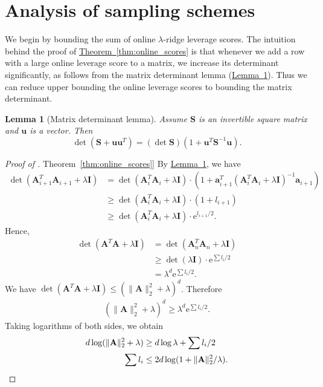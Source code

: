 \documentclass[11pt]{article}
\numberwithin{equation}{section}
\newtheorem{lemma}[theorem]{Lemma}
\theoremstyle{definition}
\theoremstyle{plain}
\newcommand{\eee}{\mathrm e}
\newcommand{\expref}[2]{\hyperref[#2]{#1~\ref{#2}}}
\newcommand{\bv}[1]{\mathbf{#1}}
\begin{document}
\section{Analysis of sampling schemes}
\label{sec:sampling}

We begin by bounding the sum of online $\lambda$-ridge leverage scores.
The intuition behind the proof of \expref{Theorem}{thm:online_scores} is that whenever we add a row with a large online leverage score to a matrix, we increase its determinant significantly, as follows from the matrix determinant lemma (\expref{Lemma}{lem:matdet}).
Thus we can reduce upper bounding the online leverage scores to bounding the matrix determinant.
\begin{lemma}[Matrix determinant lemma]
    \label{lem:matdet}
    Assume $\bv{S}$ is an invertible square matrix and $\bv{u}$ is a vector.
    Then
    $$
        \det(\bv{S} + \bv{u}\bv{u}^T) = (\det \bv{S})(1 + \bv{u}^T\bv{S}^{-1}\bv{u}).
    $$
\end{lemma}

\begin{proof}[Proof of \expref{Theorem}{thm:online_scores}]
    By \expref{Lemma}{lem:matdet}, we have
    \begin{align*}
        \det (\bv{A}_{i+1}^T\bv{A}_{i+1} + \lambda \bv{I}) &= \det (\bv{A}_i^T \bv{A}_i + \lambda \bv{I}) \cdot \left(1 + \bv{a}_{i+1}^T (\bv{A}_i^T \bv{A}_i + \lambda \bv{I})^{-1} \bv{a}_{i+1}\right)\\
                                           &\geq \det (\bv{A}_i^T \bv{A}_i + \lambda \bv{I}) \cdot (1 + l_{i+1})\\
                                           &\geq \det (\bv{A}_i^T \bv{A}_i + \lambda \bv{I}) \cdot \eee^{l_{i+1} / 2}.
    \end{align*}
    Hence,
    \begin{align*}
        \det (\bv{A}^T \bv{A} + \lambda \bv{I}) &= \det (\bv{A}_n^T \bv{A}_n + \lambda \bv{I})\\
                               &\geq \det (\lambda \bv{I}) \cdot \eee^{\sum l_i / 2}\\
                               &= \lambda^d \eee^{\sum l_i / 2}.
    \end{align*}
    We have $\det (\bv{A}^T \bv{A} + \lambda \bv{I}) \leq (\|\bv{A}\|_2^2 + \lambda)^d$.
    Therefore
    \begin{align*}
        (\|\bv{A}\|_2^2+\lambda)^d \geq \lambda^d \eee^{\sum l_i / 2}.
    \end{align*}
    Taking logarithms of both sides, we obtain
    \begin{align*}
          d \log (\|\bv{A}\|_2^2 + \lambda) &\geq d \log \lambda + \sum l_i / 2\\
   \sum l_i &\leq 2 d \log (1 + \|\bv{A}\|_2^2/\lambda).\qedhere
    \end{align*}
\end{proof}
%
\end{document}
